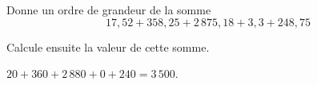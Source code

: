 \begin{myenumerate}
\item Donne un ordre de grandeur de la somme
\[17,52+358,25+2\,875,18+3,3+248,75\]
\item Calcule ensuite la valeur de cette somme.
\end{myenumerate}
\begin{myenumerate}
  \item $20+360+2\,880+0+240=3\,500$.
  \item \subitem{}\par
{}
\kern2cm\kern2cm\kern2cm
\end{myenumerate}
